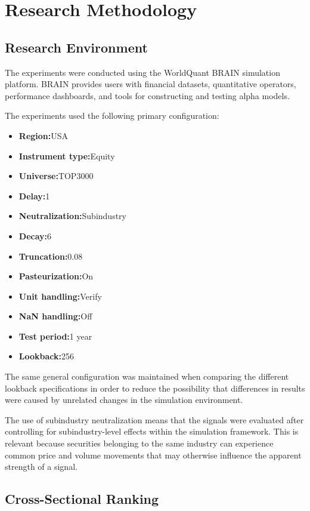 \documentclass{article}
\begin{document}
\section{Research Methodology}

\subsection{ Research Environment}

The experiments were conducted using the WorldQuant BRAIN simulation platform. BRAIN provides users with financial datasets, quantitative operators, performance dashboards, and tools for constructing and testing alpha models. 

The experiments used the following primary configuration:

\begin{itemize}
    \item \textbf{Region:}USA 
    \item \textbf{Instrument type:}Equity 
    \item \textbf{Universe:}TOP3000 
    \item \textbf{Delay:}1 
    \item \textbf{Neutralization:}Subindustry 
    \item \textbf{Decay:}6 
    \item \textbf{Truncation:}0.08 
    \item \textbf{Pasteurization:}On 
    \item \textbf{Unit handling:}Verify 
    \item \textbf{NaN handling:}Off 
    \item \textbf{Test period:}1 year 
    \item \textbf{Lookback:}256 
\end{itemize}
The same general configuration was maintained when comparing the different lookback specifications in order to reduce the possibility that differences in results were caused by unrelated changes in the simulation environment.

The use of subindustry neutralization means that the signals were evaluated after controlling for subindustry-level effects within the simulation framework. This is relevant because securities belonging to the same industry can experience common price and volume movements that may otherwise influence the apparent strength of a signal.

\subsection{Cross-Sectional Ranking}
\end{document}
